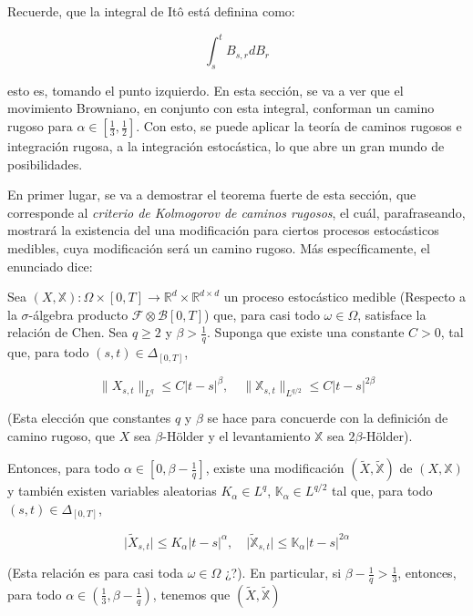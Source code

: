 Recuerde, que la integral de Itô está definina como:

\[
	\int_s^t B_{s,r} dB_r
\]
 
esto es, tomando el punto izquierdo. En esta sección, se va a ver que el movimiento Browniano, en conjunto con esta integral, conforman un camino rugoso para $\alpha \in \left[\frac{1}{3}, \frac{1}{2} \right]$. Con esto, se puede aplicar la teoría de caminos rugosos e integración rugosa, a la integración estocástica, lo que abre un gran mundo de posibilidades.

En primer lugar, se va a demostrar el teorema fuerte de esta sección, que corresponde al \textit{criterio de Kolmogorov de caminos rugosos}, el cuál, parafraseando, mostrará la existencia del una modificación para ciertos procesos estocásticos medibles, cuya modificación será un camino rugoso. Más específicamente, el enunciado dice:

\begin{theorem}

Sea $(X, \mathbb{X}): \Omega \times [0, T] \rightarrow \mathbb{R}^d \times \mathbb{R}^{d \times d}$ un proceso estocástico medible (Respecto a la $\sigma$-álgebra producto $\mathcal{F} \otimes \mathcal{B}[0, T]$) que, para casi todo $\omega \in \Omega$, satisface la relación de Chen. Sea $q \geq 2$ y $\beta > \frac{1}{q}$. Suponga que existe una constante $C > 0$, tal que, para todo $(s,t)\in \Delta_{[0,T]} $,

\[
	\lVert X_{s,t} \rVert_{L^q} \leq C \lvert t-s \rvert^{\beta}, \quad \lVert \mathbb{X}_{s,t} \rVert_{L^{q/2}} \leq C \lvert t - s \rvert^{2\beta}
\]

(Esta elección que constantes $q$ y $\beta$ se hace para concuerde con la definición de camino rugoso, que $X$ sea $\beta$-Hölder y el levantamiento $\mathbb{X}$ sea $2\beta$-Hölder).

Entonces, para todo $\alpha \in [0, \beta - \frac{1}{q}]$, existe una modificación $(\tilde{X}, \tilde{\mathbb{X}})$ de $(X, \mathbb{X})$ y también existen variables aleatorias $K_{\alpha} \in L^q$, $\mathbb{K}_{\alpha} \in L^{q/2}$ tal que, para todo $(s,t) \in \Delta_{[0,T]}$,

\[
	\lvert \tilde{X}_{s,t} \rvert \leq K_{\alpha} \lvert t - s \rvert^{\alpha}, \quad \lvert \tilde{ \mathbb{X} }_{s,t} \rvert \leq \mathbb{K}_{\alpha} \lvert t - s \rvert^{2\alpha}
\]

(Esta relación es para casi toda $\omega \in \Omega$ ¿?). En particular, si $\beta - \frac{1}{q} > \frac{1}{3}$, entonces, para todo $\alpha \in (\frac{1}{3}, \beta - \frac{1}{q})$, tenemos que $(\tilde{X}, \tilde{\mathbb{X}})$

\end{theorem}

